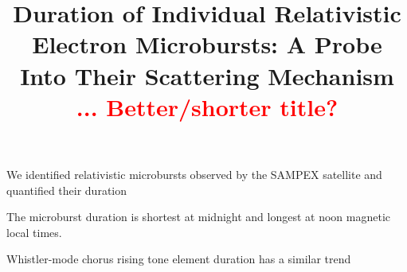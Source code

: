 \documentclass[draft]{agujournal2019}
\begin{document}
%
%



\title{Duration of Individual Relativistic Electron Microbursts: A Probe Into Their Scattering Mechanism \textcolor{red}{... Better/shorter title?}}

%
%










\begin{keypoints}
\item We identified relativistic microbursts observed by the SAMPEX satellite and quantified their duration
\item The microburst duration is shortest at midnight and longest at noon magnetic local times.
\item Whistler-mode chorus rising tone element duration has  a similar trend
\end{keypoints}
\end{document}
